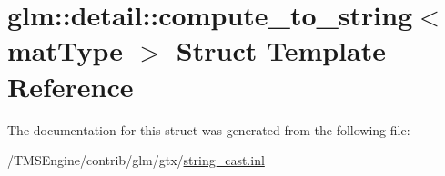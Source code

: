 \hypertarget{structglm_1_1detail_1_1compute__to__string}{}\section{glm\+:\+:detail\+:\+:compute\+\_\+to\+\_\+string$<$ mat\+Type $>$ Struct Template Reference}
\label{structglm_1_1detail_1_1compute__to__string}


The documentation for this struct was generated from the following file\+:\begin{DoxyCompactItemize}
\item 
/\+T\+M\+S\+Engine/contrib/glm/gtx/\hyperlink{string__cast_8inl}{string\+\_\+cast.\+inl}\end{DoxyCompactItemize}
